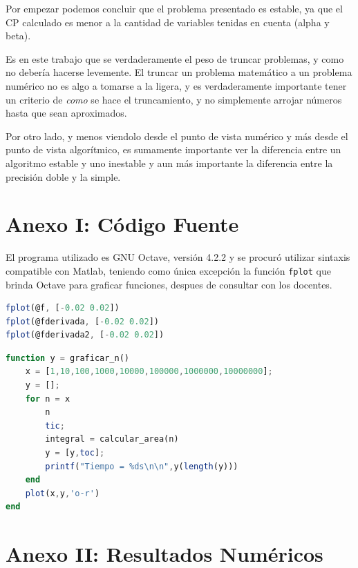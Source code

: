 \documentclass[11pt,a4paper]{article}
\begin{document}
Por empezar podemos concluir que el problema presentado es estable, ya que el CP calculado es menor a la cantidad de variables tenidas en cuenta (alpha y beta).

Es en este trabajo que se verdaderamente el peso de truncar problemas, y como no debería hacerse levemente. El truncar un problema matemático a un problema numérico no es algo a tomarse a la ligera, y es verdaderamente importante tener un criterio de \textit{como} se hace el truncamiento, y no simplemente arrojar números hasta que sean aproximados. 

Por otro lado, y menos viendolo desde el punto de vista numérico y más desde el punto de vista algorítmico,  es sumamente importante ver la diferencia entre un algoritmo estable y uno inestable y aun más importante la diferencia entre la precisión doble y la simple.

\newpage
\appendix
\section{Anexo I: Código Fuente}

El programa utilizado es GNU Octave, versión 4.2.2 y se procuró utilizar sintaxis compatible con Matlab, teniendo como única excepción la función \texttt{fplot} que brinda Octave para graficar funciones, despues de consultar con los docentes.



\newpage


\newpage


\newpage
\begin{lstlisting}[language=Octave,title=Generación de graficos]
fplot(@f, [-0.02 0.02])
fplot(@fderivada, [-0.02 0.02])
fplot(@fderivada2, [-0.02 0.02])
\end{lstlisting}

\begin{lstlisting}[language=Octave,title=Truncamiento y gráfico de n]
function y = graficar_n()
    x = [1,10,100,1000,10000,100000,1000000,10000000];
    y = [];
    for n = x
        n
        tic;
        integral = calcular_area(n)
        y = [y,toc]; 
        printf("Tiempo = %ds\n\n",y(length(y)))   
    end
    plot(x,y,'o-r')
end
\end{lstlisting}

\newpage
\section{Anexo II: Resultados Numéricos}
\end{document}
